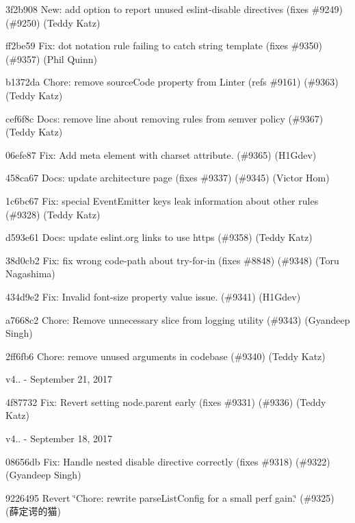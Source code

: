 \begin{DoxyItemize}
\item 3f2b908 New\+: add option to report unused eslint-\/disable directives (fixes \#9249) (\#9250) (Teddy Katz)
\item ff2be59 Fix\+: dot notation rule failing to catch string template (fixes \#9350) (\#9357) (Phil Quinn)
\item b1372da Chore\+: remove source\+Code property from Linter (refs \#9161) (\#9363) (Teddy Katz)
\item cef6f8c Docs\+: remove line about removing rules from semver policy (\#9367) (Teddy Katz)
\item 06efe87 Fix\+: Add meta element with charset attribute. (\#9365) (H1\+Gdev)
\item 458ca67 Docs\+: update architecture page (fixes \#9337) (\#9345) (Victor Hom)
\item 1c6bc67 Fix\+: special Event\+Emitter keys leak information about other rules (\#9328) (Teddy Katz)
\item d593e61 Docs\+: update eslint.\+org links to use https (\#9358) (Teddy Katz)
\item 38d0cb2 Fix\+: fix wrong code-\/path about try-\/for-\/in (fixes \#8848) (\#9348) (Toru Nagashima)
\item 434d9e2 Fix\+: Invalid font-\/size property value issue. (\#9341) (H1\+Gdev)
\item a7668c2 Chore\+: Remove unnecessary slice from logging utility (\#9343) (Gyandeep Singh)
\item 2ff6fb6 Chore\+: remove unused arguments in codebase (\#9340) (Teddy Katz)
\end{DoxyItemize}

v4.. -\/ September 21, 2017


\begin{DoxyItemize}
\item 4f87732 Fix\+: Revert setting node.\+parent early (fixes \#9331) (\#9336) (Teddy Katz)
\end{DoxyItemize}

v4.. -\/ September 18, 2017


\begin{DoxyItemize}
\item 08656db Fix\+: Handle nested disable directive correctly (fixes \#9318) (\#9322) (Gyandeep Singh)
\item 9226495 Revert \char`\"{}\+Chore\+: rewrite parse\+List\+Config for a small perf gain.\char`\"{} (\#9325) (薛定谔的猫)
\end{DoxyItemize}

